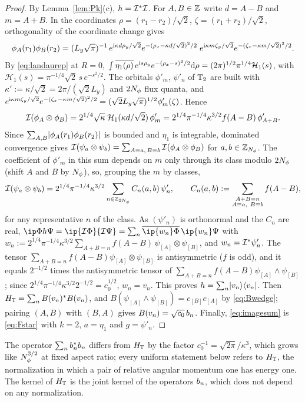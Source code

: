 \begin{proof}
By Lemma~\ref{lem:Pk}(c), $h=\mathcal{I}^*\mathcal{I}$. For $A,B\in\mathbb{Z}$ write $d=A-B$ and $m=A+B$. In the coordinates
$\rho=(r_1-r_2)/\sqrt2$, $\zeta=(r_1+r_2)/\sqrt2$, orthogonality of the coordinate change gives
\[
\phi_{A}(r_1)\phi_{B}(r_2)=(L_y\sqrt\pi)^{-1}\,e^{\mathrm{i}\kappa d\rho_y/\sqrt2}e^{-(\rho_x-\kappa d/\sqrt2)^2/2}\;
e^{\mathrm{i}\kappa m\zeta_y/\sqrt2}e^{-(\zeta_x-\kappa m/\sqrt2)^2/2}.
\]
By \eqref{eq:landaurep} at $R=0$, $\int\overline{\eta_1(\rho)}\,e^{\mathrm{i} s\rho_y}e^{-(\rho_x-s)^2/2}\mathrm{d}\rho=(2\pi)^{1/2}\pi^{1/4}\mathcal H_1(s)$,
with $\mathcal H_1(s)=\pi^{-1/4}\sqrt2\,s\,e^{-s^2/2}$. The orbitals $\phi'_m$, $\psi'_n$ of $\mathbb{T}_2$ are built with
$\kappa':=\kappa/\sqrt2=2\pi/(\sqrt2L_y)$ and $2N_{\phi}$ flux quanta, and
$e^{\mathrm{i}\kappa m\zeta_y/\sqrt2}e^{-(\zeta_x-\kappa m/\sqrt2)^2/2}=(\sqrt2L_y\sqrt\pi)^{1/2}\phi'_m(\zeta)$. Hence
\[
\mathcal{I}(\phi_{A}\otimes\phi_{B})=2^{1/4}\sqrt\kappa\;\mathcal H_1(\kappa d/\sqrt2)\,\phi'_m
=2^{1/4}\pi^{-1/4}\kappa^{3/2}f(A-B)\,\phi'_{A+B} .
\]
Since $\sum_{A,B}\lvert\phi_{A}(r_1)\phi_{B}(r_2)\rvert$ is bounded and $\eta_1$ is integrable, dominated convergence gives
$\mathcal{I}(\psi_a\otimes\psi_b)=\sum_{A\equiv a,\,B\equiv b}\mathcal{I}(\phi_{A}\otimes\phi_{B})$ for $a,b\in\mathbb{Z}_{N_{\phi}}$. The coefficient of
$\phi'_m$ in this sum depends on $m$ only through its class modulo $2N_{\phi}$ (shift $A$ and $B$ by $N_{\phi}$), so, grouping the
$m$ by classes,
\[
\mathcal{I}(\psi_a\otimes\psi_b)=2^{1/4}\pi^{-1/4}\kappa^{3/2}\sum_{n\in\mathbb{Z}_{2N_{\phi}}}C_n(a,b)\,\psi'_n,\qquad
C_n(a,b):=\sum_{\substack{A+B=n\\ A\equiv a,\ B\equiv b}}f(A-B),
\]
for any representative $n$ of the class. As $(\psi'_n)$ is orthonormal and the $C_n$ are real,
$\ip\Phi{h\Psi}=\ip{\Fib\Phi}{\Fib\Psi}=\sum_n\overline{\ip{w_n}\Phi}\,\ip{w_n}\Psi$ with
$w_n:=2^{1/4}\pi^{-1/4}\kappa^{3/2}\sum_{A+B=n}f(A-B)\,\psi_{[A]}\otimes\psi_{[B]}$, and $w_n=\mathcal{I}^*\psi'_n$. The tensor
$\sum_{A+B=n}f(A-B)\psi_{[A]}\otimes\psi_{[B]}$ is antisymmetric ($f$ is odd), and it equals $2^{-1/2}$ times the
antisymmetric tensor of $\sum_{A+B=n}f(A-B)\psi_{[A]}\wedge\psi_{[B]}$; since $2^{1/4}\pi^{-1/4}\kappa^{3/2}2^{-1/2}=c_0^{1/2}$,
$w_n=v_n$. This proves $h=\sum_n\lvert v_n\rangle\langle v_n\rvert$. Then $H_{\mathbb{T}}=\sum_nB(v_n)^*B(v_n)$, and
$B(\psi_{[A]}\wedge\psi_{[B]})=c_{[B]}c_{[A]}$ by \eqref{eq:Bwedge}; pairing $(A,B)$ with $(B,A)$ gives $B(v_n)=\sqrt{c_0}\,b_{n}$.
Finally, \eqref{eq:imagesum} is \eqref{eq:Fstar} with $k=2$, $a=\eta_1$ and $g=\psi'_n$.
\end{proof}

\begin{remark}\label{rem:normalization}
The operator $\sum_nb_{n}^*b_{n}$ differs from $H_{\mathbb{T}}$ by the factor $c_0^{-1}=\sqrt{2\pi}/\kappa^3$, which grows like
$N_{\phi}^{3/2}$ at fixed aspect ratio; every uniform statement below refers to $H_{\mathbb{T}}$, the normalization in which a pair of
relative angular momentum one has energy one. The kernel of $H_{\mathbb{T}}$ is the joint kernel of the operators $b_{n}$, which
does not depend on any normalization.
\end{remark}
